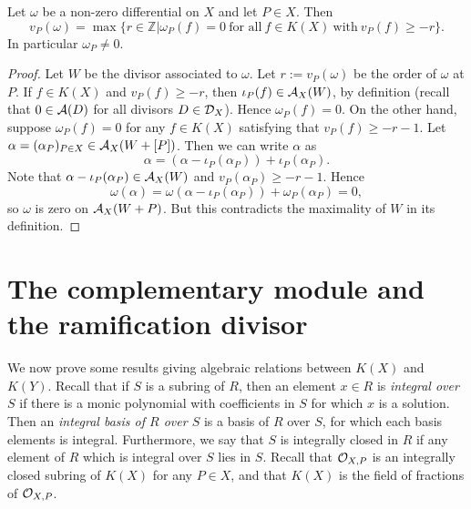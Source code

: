     \begin{prop}\label{propertyofomega}
    Let $\omega$ be a non-zero differential on $X$ and let $P\in X$. Then
        \[
        v_P(\omega) = \max \{r\in \mathbb{Z}|\omega_P(f) = 0\ \text{for all} \ f\in K(X) \ \text{with}\ v_P(f) \geq -r\}.
        \]
    In particular $\omega_P \neq 0$.
    \end{prop}
    \begin{proof}
    Let $W$ be the divisor associated to $\omega$.
    Let $r:=v_P(\omega)$ be the order of $\omega$ at $P$.
    If $f\in K(X)$ and $v_P(f)\geq -r$, then $\iota_P(f) \in {\mathcal A}_X(W)$, by definition (recall that $0 \in {\mathcal A}(D)$ for all divisors $D \in {\mathcal D}_X$).
    Hence $\omega_P(f) = 0$.
    On the other hand, suppose $\omega_P(f) = 0$ for any $f\in K(X)$ satisfying that $v_P(f) \geq -r-1$.
    Let $\alpha = (\alpha_P)_{P \in X} \in {\mathcal A}_X(W+[P])$.
    Then we can write $\alpha$ as
        \[
        \alpha = (\alpha-\iota_P(\alpha_P)) + \iota_P(\alpha_P).
        \]
    Note that $\alpha - \iota_P(\alpha_P)\in {\mathcal A}_X(W)$ and $v_P(\alpha_P) \geq -r-1$.
    Hence
        \[
        \omega(\alpha) = \omega(\alpha-\iota_P(\alpha_P))  + \omega_P(\alpha_P) = 0,
        \]
    so $\omega$ is zero on ${\mathcal A}_X(W+P)$.
    But this contradicts the maximality of $W$ in its definition.
    \end{proof}

\section{The complementary module and the ramification divisor}


We now prove some results giving algebraic relations between $K(X)$ and $K(Y)$.
Recall that if $S$ is a subring of $R$, then an element $x\in R$ is {\em integral over $S$} if there is a monic polynomial with coefficients in $S$ for which $x$ is a solution.
Then an {\em integral basis of $R$ over $S$} is a basis of $R$ over $S$, for which each basis elements is integral.
Furthermore, we say that $S$ is integrally closed in $R$ if any element of $R$ which is integral over $S$ lies in $S$.
Recall that ${\cal O}_{X,P}$ is an integrally closed subring of $K(X)$ for any $P\in X$, and that $K(X)$ is the field of fractions of ${\cal O}_{X,P}$.


